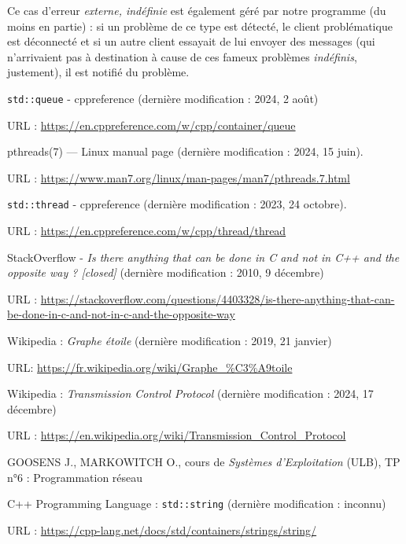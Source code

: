 \documentclass{article}
\begin{document}
Ce cas d'erreur \textit{externe, indéfinie} est également géré par notre programme (du moins en partie) : si un problème de ce type est détecté, le client problématique est déconnecté et si un autre client essayait de lui envoyer des messages (qui n'arrivaient pas à destination à cause de ces fameux problèmes \textit{indéfinis}, justement), il est notifié du problème.

\begin{thebibliography}{999}
    \texttt{std::queue} - cppreference (dernière modification : 2024, 2 août)

    URL : \url{https://en.cppreference.com/w/cpp/container/queue}
    
        pthreads(7) — Linux manual page (dernière modification : 2024, 15 juin).

        URL : \url{https://www.man7.org/linux/man-pages/man7/pthreads.7.html}

        \texttt{std::thread} - cppreference (dernière modification : 2023, 24 octobre).

        URL : \url{https://en.cppreference.com/w/cpp/thread/thread}

        StackOverflow - \textit{Is there anything that can be done in C and not in C++ and the opposite way ? [closed]} (dernière modification : 2010, 9 décembre)
        
    URL : \url{https://stackoverflow.com/questions/4403328/is-there-anything-that-can-be-done-in-c-and-not-in-c-and-the-opposite-way}

		Wikipedia : \textit{Graphe étoile} (dernière modification : 2019, 21 janvier)
        
        URL: \url{https://fr.wikipedia.org/wiki/Graphe_%C3%A9toile}

    Wikipedia : \textit{Transmission Control Protocol} (dernière modification : 2024, 17 décembre)

    URL : \url{https://en.wikipedia.org/wiki/Transmission_Control_Protocol}

    GOOSENS J., MARKOWITCH O., cours de \textit{Systèmes d'Exploitation} (ULB), TP n°6 : Programmation réseau

    C++ Programming Language : \texttt{std::string} (dernière modification : inconnu)

    URL : \url{https://cpp-lang.net/docs/std/containers/strings/string/}


\end{thebibliography}
\end{document}
